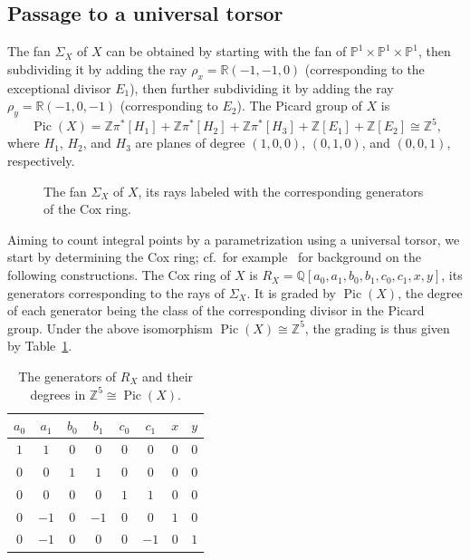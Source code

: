 \documentclass[a4paper, twoside, 10pt]{amsart}
\newcommand{\PP}{\mathbb{P}}
\newcommand{\RR}{\mathbb{R}}
\newcommand{\ZZ}{\mathbb{Z}}
\newcommand{\QQ}{\mathbb{Q}}
\DeclareMathOperator{\Pic}{Pic}
\theoremstyle{definition}
\begin{document}
\subsection{Passage to a universal torsor}\label{ssec:toric-torsor}

The fan $\Sigma_X$ of $X$ can be obtained by starting with the fan of $\PP^1\times\PP^1\times\PP^1$, then subdividing it by adding the ray $\rho_x=\RR(-1,-1,0)$ (corresponding to the exceptional divisor $E_1$), then further subdividing it by adding the ray $\rho_y=\RR(-1,0,-1)$ (corresponding to $E_2$).
The Picard group of $X$ is
\[
  \Pic(X)=\ZZ \pi^*[H_1] + \ZZ \pi^*[H_2] + \ZZ \pi^*[H_3] +\ZZ [E_1] + \ZZ [E_2] \cong \ZZ^5 \text{,}
\]
where $H_1$, $H_2$, and $H_3$ are planes of degree $(1,0,0)$, $(0,1,0)$, and $(0,0,1)$, respectively.

\begin{figure}[ht]
  \begin{center}
    
    \caption[The fan $\Sigma_X$ of $X$]{The fan $\Sigma_X$ of $X$, its rays labeled with the corresponding generators of the Cox ring.}
  \end{center}
\end{figure}

Aiming to count integral points by a parametrization using a universal torsor, we start by determining the Cox ring; cf.\ for example~\cite[\S\,2.1.3]{MR3307753} for background on the following constructions.
The Cox ring of $X$ is $R_X=\QQ[a_0,a_1,b_0,b_1,c_0,c_1,x,y]$, its generators corresponding to the rays of $\Sigma_X$. It is graded by $\Pic(X)$, the degree of each generator being the class of the corresponding divisor in the Picard group.  Under the above isomorphism $\Pic(X)\cong \ZZ^5$, the grading is thus given by Table~\ref{tab:degrees}.
\begin{table}[ht]
  \begin{tabular}{cccccccc}\toprule 
    $a_0$ & $a_1$ & $b_0$ & $b_1$ & $c_0$ & $c_1$ &   $x$ &   $y$ \\ \midrule
      $1$ &   $1$ &   $0$ &   $0$ &   $0$ &   $0$ &   $0$ &   $0$ \\
      $0$ &   $0$ &   $1$ &   $1$ &   $0$ &   $0$ &   $0$ &   $0$ \\
      $0$ &   $0$ &   $0$ &   $0$ &   $1$ &   $1$ &   $0$ &   $0$ \\
      $0$ &  $-1$ &   $0$ &  $-1$ &   $0$ &   $0$ &   $1$ &   $0$ \\
      $0$ &  $-1$ &   $0$ &   $0$ &   $0$ &  $-1$ &   $0$ &   $1$ \\ \bottomrule
  \end{tabular}
  \caption{The generators of $R_X$ and their degrees in $\ZZ^5 \cong \Pic(X)$.}\label{tab:degrees}
\end{table}
\end{document}
